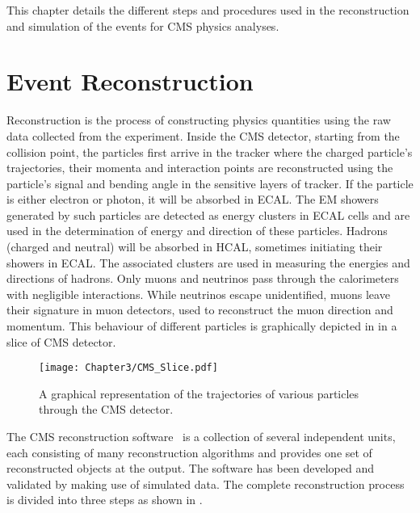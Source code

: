 This chapter details the different steps and procedures used in the reconstruction and simulation of the events for CMS physics analyses.
\section{Event Reconstruction}
Reconstruction is the process of constructing physics quantities using the raw data collected from the experiment. 
Inside the CMS detector, starting from the collision point, the particles first arrive in the tracker where the charged particle's trajectories, their momenta and
interaction points are reconstructed using the particle's signal and bending angle in the sensitive layers of tracker. If the particle is either electron or photon,
it will be absorbed in ECAL. The EM showers generated by such particles are detected as energy clusters in ECAL cells and are used in the determination
of energy and direction of these particles. Hadrons (charged and neutral) will be absorbed in HCAL, sometimes initiating their showers in ECAL.
The associated clusters are used in measuring the energies and directions of hadrons. Only muons and neutrinos pass through the calorimeters with negligible interactions.
While neutrinos escape unidentified, muons leave their signature in muon detectors, used to reconstruct the muon direction and momentum.
This behaviour of different particles is graphically depicted in \fig{\ref{fig:CMS_slice}} in a slice of CMS detector.

\begin{figure}[h]
\begin{center}
\texttt{[image: Chapter3/CMS\_Slice.pdf]}
\caption{A graphical representation of the trajectories of various particles through the CMS detector.}
\label{fig:CMS_slice}
\end{center}
\end{figure}

The CMS reconstruction software~\cite{Lange:2011zza} is a collection of several independent units, each consisting of many reconstruction algorithms
and provides one set of reconstructed objects at the output. The software has been developed and validated by making use of simulated data.
The complete reconstruction process is divided into three steps as shown in \fig{\ref{fig:CMS_reco_steps}}. 

